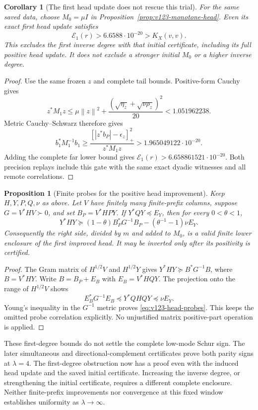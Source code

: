 \documentclass[11pt]{article}
\newtheorem{proposition}[theorem]{Proposition}
\newtheorem{corollary}[theorem]{Corollary}
\theoremstyle{remark}
\newcommand{\norm}[1]{\left\lVert #1\right\rVert}
\begin{document}
\begin{corollary}[The first head update does not rescue this trial]
\label{cor:v123-updated-first-fails}
For the same saved data, choose $M_0=\mu I$ in
Proposition~\ref{prop:v123-monotone-head}. Even its exact first
head update satisfies
\[
 \mathcal E_1(r)>6.6588\cdot10^{-20}>K_X(v,v).
\]
This excludes the first inverse degree with that initial certificate,
including its full positive head update. It does not exclude a
stronger initial $M_0$ or a higher inverse degree.
\end{corollary}
\begin{proof}
Use the same frozen $z$ and complete tail bounds. Positive-form
Cauchy gives
\[
 z^*M_1z\le\mu\norm z^2+
 \frac{(\sqrt{\eta_z}+\sqrt{\nu\rho_z})^2}{20}
       <1.051962238.
\]
Metric Cauchy--Schwarz therefore gives
\[
 b_1^*M_1^{-1}b_1
 \ge\frac{[|z^*b_P|-\epsilon_z]_+^2}{z^*M_1z}
       >1.965049122\cdot10^{-20}.
\]
Adding the complete far lower bound gives
$\mathcal E_1(r)>6.658861521\cdot10^{-20}$.
Both precision replays include this gate with the same exact
dyadic witnesses and all remote correlations.
\end{proof}

\begin{proposition}[Finite probes for the positive head improvement]
\label{prop:v123-head-probes}
Keep $H,Y,P,Q,\nu$ as above. Let $V$ have finitely many
finite-prefix columns, suppose $G=V^*HV\succ0$, and set
$B_P=V^*HPY$. If $Y^*QY\preceq E_Y$, then for every
$0<\theta<1$,
\begin{equation}\label{eq:v123-head-probes}
 Y^*HY\succeq
 (1-\theta)B_P^*G^{-1}B_P
       -(\theta^{-1}-1)\nu E_Y.
\end{equation}
Consequently the right side, divided by $m$ and added to $M_0$,
is a valid finite lower enclosure of the first improved head.
It may be inverted only after its positivity is certified.
\end{proposition}
\begin{proof}
The Gram matrix of $H^{1/2}V$ and $H^{1/2}Y$ gives
$Y^*HY\succeq B^*G^{-1}B$, where $B=V^*HY$.
Write $B=B_P+E_B$ with $E_B=V^*HQY$.
The projection onto the range of $H^{1/2}V$ shows
\[
 E_B^*G^{-1}E_B\preceq Y^*QHQY\preceq\nu E_Y.
\]
Young's inequality in the $G^{-1}$ metric proves
\eqref{eq:v123-head-probes}. This keeps the omitted probe
correlation explicitly. No unjustified matrix positive-part
operation is applied.
\end{proof}

These first-degree bounds do not settle the complete low-mode Schur
sign. The later simultaneous and directional-complement certificates
prove both parity signs at $\lambda=4$.
The first-degree obstruction now has a proof even with the
induced head update and the saved initial certificate. Increasing
the inverse degree, or strengthening the initial certificate,
requires a different complete enclosure.
Neither finite-prefix improvements nor convergence at this fixed
window establishes uniformity as $\lambda\to\infty$.
\end{document}
